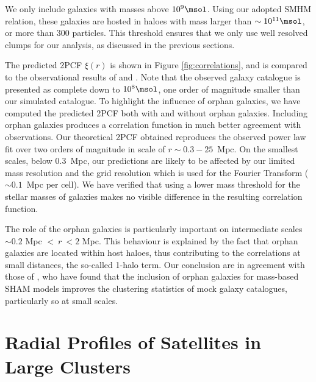We only  include galaxies with  masses above $10^9 \msol$.   Using our
adopted SMHM relation,  these galaxies are hosted in  haloes with mass
larger than  $\sim 10^{11} \msol$,  or more than 300  particles.  This
threshold  ensures that  we  only  use well  resolved  clumps for  our
analysis, as discussed in the previous sections.

The predicted 2PCF $\xi(r)$ is shown in Figure \ref{fig:correlations},
and is  compared to  the observational  results of  \cite{liDistributionStellarMass2009} and
\cite{zehaviDeparturesPowerLaw2004}.   Note  that  the observed  galaxy  catalogue  is
presented as  complete down  to $10^8 \msol$,  one order  of magnitude
smaller than our  simulated catalogue.  To highlight  the influence of
orphan galaxies,  we have  computed the predicted  2PCF both  with and
without  orphan  galaxies.   Including   orphan  galaxies  produces  a
correlation function in much  better agreement with observations.  Our
theoretical 2PCF obtained  reproduces the observed power  law fit over
two orders  of magnitude  in scale  of $r\sim 0.3  - 25$~Mpc.   On the
smallest  scales, below  0.3~Mpc,  our predictions  are  likely to  be
affected by our limited mass resolution and the grid resolution which
is used for the Fourier Transform ($\sim 0.1$~Mpc per cell). We have
verified that using a lower mass threshold for the stellar masses of
galaxies makes no visible difference in the resulting correlation function.

The  role  of  the  orphan   galaxies  is  particularly  important  on
intermediate scales $\sim  0.2$ Mpc $<\ r \ <  2$ Mpc.  This behaviour
is explained by the fact that  orphan galaxies are located within host
haloes, thus contributing to the  correlations at small distances, the
so-called 1-halo term.  Our conclusion are in agreement  with those of
\cite{campbellGalaxyClusteringCrisis2018}, who  have found that  the inclusion of  orphan galaxies
for mass-based SHAM models improves  the clustering statistics of mock
galaxy catalogues, particularly so at small scales.

\section{Radial Profiles of Satellites in Large Clusters}\label{chap:radial-profiles}

